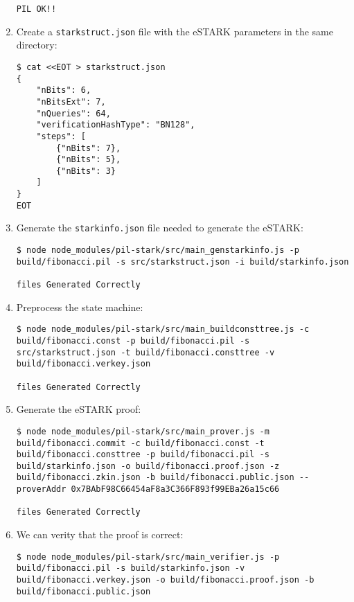 \begin{enumerate}
\begin{lstlisting}[style=termt]
PIL OK!!
\end{lstlisting}

\item Create a \texttt{starkstruct.json} file with the eSTARK parameters in the same directory:
\begin{lstlisting}[style=termt]
$ cat <<EOT > starkstruct.json
{
    "nBits": 6,
    "nBitsExt": 7,
    "nQueries": 64,
    "verificationHashType": "BN128",
    "steps": [
        {"nBits": 7},
        {"nBits": 5},
        {"nBits": 3}
    ]
}
EOT
\end{lstlisting}

\item Generate the \texttt{starkinfo.json} file needed to generate the eSTARK:
\begin{lstlisting}[style=termt]
$ node node_modules/pil-stark/src/main_genstarkinfo.js -p build/fibonacci.pil -s src/starkstruct.json -i build/starkinfo.json

files Generated Correctly
\end{lstlisting}

\item Preprocess the state machine:
\begin{lstlisting}[style=termt]
$ node node_modules/pil-stark/src/main_buildconsttree.js -c build/fibonacci.const -p build/fibonacci.pil -s src/starkstruct.json -t build/fibonacci.consttree -v build/fibonacci.verkey.json

files Generated Correctly
\end{lstlisting}

\item Generate the eSTARK proof:
\begin{lstlisting}[style=termt]
$ node node_modules/pil-stark/src/main_prover.js -m build/fibonacci.commit -c build/fibonacci.const -t build/fibonacci.consttree -p build/fibonacci.pil -s build/starkinfo.json -o build/fibonacci.proof.json -z build/fibonacci.zkin.json -b build/fibonacci.public.json --proverAddr 0x7BAbF98C66454aF8a3C366F893f99EBa26a15c66

files Generated Correctly
\end{lstlisting}

\item We can verity that the proof is correct:
\begin{lstlisting}[style=termt]
$ node node_modules/pil-stark/src/main_verifier.js -p build/fibonacci.pil -s build/starkinfo.json -v build/fibonacci.verkey.json -o build/fibonacci.proof.json -b build/fibonacci.public.json


\end{lstlisting}
\end{enumerate}
